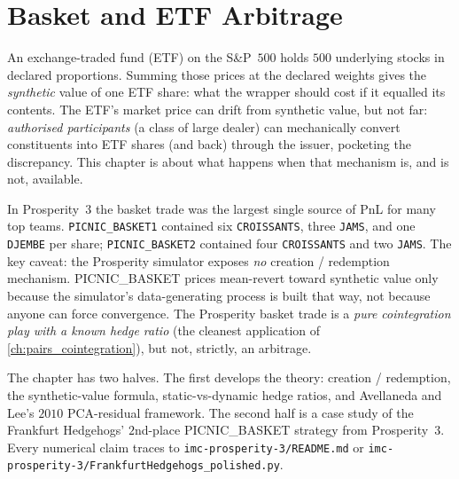 \chapter{Basket and ETF Arbitrage}
\label{ch:basket_etf_arb}

An exchange-traded fund (ETF) on the S\&P~$500$ holds $500$
underlying stocks in declared proportions. Summing those prices at
the declared weights gives the \emph{synthetic} value of one ETF
share: what the wrapper should cost if it equalled its contents.
The ETF's market price can drift from synthetic value, but not far:
\emph{authorised participants} (a class of large dealer) can
mechanically convert constituents into ETF shares (and back)
through the issuer, pocketing the discrepancy. This chapter is
about what happens when that mechanism is, and is not, available.

In Prosperity~$3$ the basket trade was the largest single source of
PnL for many top teams. \texttt{PICNIC\_BASKET1} contained six
\texttt{CROISSANTS}, three \texttt{JAMS}, and one \texttt{DJEMBE}
per share; \texttt{PICNIC\_BASKET2} contained four
\texttt{CROISSANTS} and two \texttt{JAMS}. The key caveat: the
Prosperity simulator exposes \emph{no} creation / redemption
mechanism. PICNIC\_BASKET prices mean-revert toward synthetic value
only because the simulator's data-generating process is built that
way, not because anyone can force convergence. The Prosperity
basket trade is a \emph{pure cointegration play with a known hedge
ratio} (the cleanest application of
\cref{ch:pairs_cointegration}), but not, strictly, an arbitrage.

The chapter has two halves. The first develops the theory: creation
/ redemption, the synthetic-value formula, static-vs-dynamic hedge
ratios, and Avellaneda and Lee's $2010$ PCA-residual framework.
The second half is a case study of the Frankfurt Hedgehogs'
$2$nd-place PICNIC\_BASKET strategy from Prosperity~$3$. Every
numerical claim traces to
\texttt{imc-prosperity-3/README.md} or
\texttt{imc-prosperity-3/FrankfurtHedgehogs\_polished.py}.

